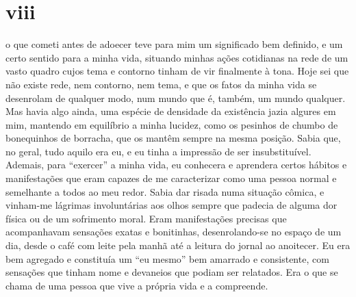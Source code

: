 

\section{viii}

 o que cometi antes de adoecer teve para mim um significado bem
definido, e um certo sentido para a minha vida, situando minhas ações
cotidianas na rede de um vasto quadro cujos tema e contorno tinham de
vir finalmente à tona. Hoje sei que não existe rede, nem contorno, nem
tema, e que os fatos da minha vida se desenrolam de qualquer modo, num mundo
que é, também, um mundo qualquer. Mas havia algo ainda, uma espécie de
densidade da existência jazia algures em mim, mantendo em equilíbrio a
minha lucidez, como os pesinhos de chumbo de bonequinhos de borracha,
que os mantêm sempre na mesma posição. Sabia que, no geral, tudo aquilo
era eu, e eu tinha a impressão de ser insubstituível. Ademais, para
``exercer'' a minha vida, eu conhecera e aprendera certos hábitos e
manifestações que eram capazes de me caracterizar como uma pessoa normal
e semelhante a todos ao meu redor. Sabia dar risada numa situação
cômica, e vinham-me lágrimas involuntárias aos olhos sempre que padecia
de alguma dor física ou de um sofrimento moral. Eram manifestações
precisas que acompanhavam sensações exatas e bonitinhas, desenrolando-se
no espaço de um dia, desde o café com leite pela manhã até a leitura do
jornal ao anoitecer. Eu era bem agregado e constituía um ``eu mesmo''
bem amarrado e consistente, com sensações que tinham nome e devaneios
que podiam ser relatados. Era o que se chama de uma pessoa que vive a
própria vida e a compreende.

